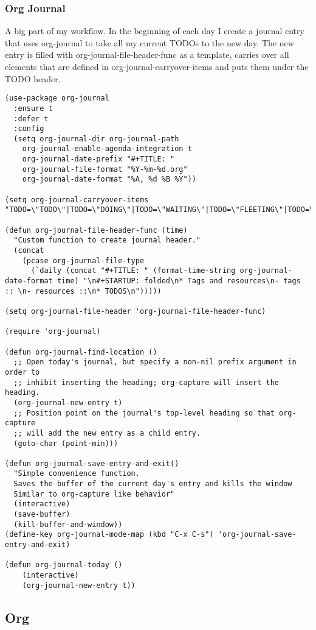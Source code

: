 \documentclass[11pt]{article}
\begin{document}
\subsubsection{Org Journal}
\label{sec:org0ded4f0}
A big part of my workflow. In the beginning of each day I create a journal entry that uses org-journal to take all my current TODOs to the new day. The new entry is filled with org-journal-file-header-func as a template, carries over all elements that are defined in org-journal-carryover-items and puts them under the TODO header.
\begin{verbatim}
(use-package org-journal
  :ensure t
  :defer t
  :config
  (setq org-journal-dir org-journal-path
	org-journal-enable-agenda-integration t
	org-journal-date-prefix "#+TITLE: "
	org-journal-file-format "%Y-%m-%d.org"
	org-journal-date-format "%A, %d %B %Y"))

(setq org-journal-carryover-items "TODO=\"TODO\"|TODO=\"DOING\"|TODO=\"WAITING\"|TODO=\"FLEETING\"|TODO=\"LONGTERM\"")

(defun org-journal-file-header-func (time)
  "Custom function to create journal header."
  (concat
    (pcase org-journal-file-type
      (`daily (concat "#+TITLE: " (format-time-string org-journal-date-format time) "\n#+STARTUP: folded\n* Tags and resources\n- tags :: \n- resources ::\n* TODOS\n")))))

(setq org-journal-file-header 'org-journal-file-header-func)

(require 'org-journal)

(defun org-journal-find-location ()
  ;; Open today's journal, but specify a non-nil prefix argument in order to
  ;; inhibit inserting the heading; org-capture will insert the heading.
  (org-journal-new-entry t)
  ;; Position point on the journal's top-level heading so that org-capture
  ;; will add the new entry as a child entry.
  (goto-char (point-min)))

(defun org-journal-save-entry-and-exit()
  "Simple convenience function.
  Saves the buffer of the current day's entry and kills the window
  Similar to org-capture like behavior"
  (interactive)
  (save-buffer)
  (kill-buffer-and-window))
(define-key org-journal-mode-map (kbd "C-x C-s") 'org-journal-save-entry-and-exit)

(defun org-journal-today ()
    (interactive)
    (org-journal-new-entry t))
\end{verbatim}
\subsection{Org}
\label{sec:orgc2b3995}
\end{document}
